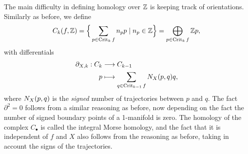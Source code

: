 The main difficulty in defining homology over $\mathbb{Z}$ is keeping track of orientations.
Similarly as before, we define
    \[
        C_k(f, \mathbb{Z}) = \Big\{ \sum_{p \in \operatorname{Crit}_k f} n_p p  \mid n_p \in \mathbb{Z} \Big\}  = \bigoplus_{p \in \operatorname{Crit}_k f} \mathbb{Z} p
    ,\] 
    with differentials
    \begin{align*}
        \partial_{X, k}: C_k &\longrightarrow C_{k-1} \\
        p &\longmapsto \sum_{q \in \operatorname{Crit}_{k-1} f} N_{X}(p, q) q
    ,\end{align*}
    where $N_{X}(p, q)$ is the \emph{signed} number of trajectories between  $p$ and $q$.
    The fact $\partial^2 = 0$ follows from a similar reasoning as before, now depending on the fact the number of signed boundary points of a 1-manifold is zero.
    The homology of the complex $C_\bullet$ is called the integral Morse homology, and the fact that it is independent of $f$ and $X$ also follows from the reasoning as before, taking in account the signs of the trajectories.

